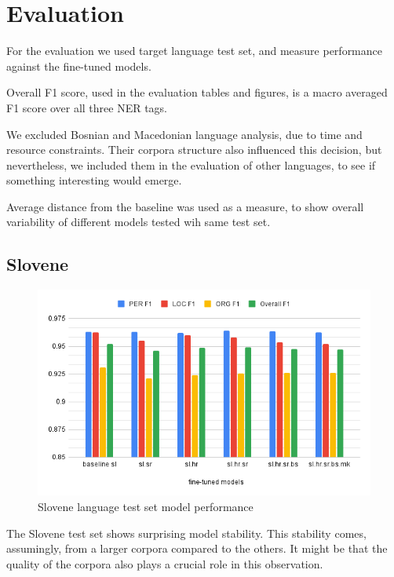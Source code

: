 \documentclass[sigconf]{acmart}
\begin{document}
\section{Evaluation}
\label{sec:evaluation}
For the evaluation we used target language test set, and measure performance against the fine-tuned models.

Overall F1 score, used in the evaluation tables and figures, is a macro averaged F1 score over all three NER tags.

We excluded Bosnian and Macedonian language analysis, due to time and resource constraints.
Their corpora structure also influenced this decision, but nevertheless, we included them in the evaluation of other languages, to see if something interesting would emerge.

Average distance from the baseline was used as a measure, to show overall variability of different models tested wih same test set.
\subsection{Slovene}
\label{subsec:slovene}

\begin{figure}[H]
  \caption{Slovene language test set model performance}
  \label{fig:eval_sl}
  \centering
  \includegraphics[width=\linewidth]{eval_sl}
\end{figure}

The Slovene test set shows surprising model stability.
This stability comes, assumingly, from a larger corpora compared to the others.
It might be that the quality of the corpora also plays a crucial role in this observation.
\end{document}
